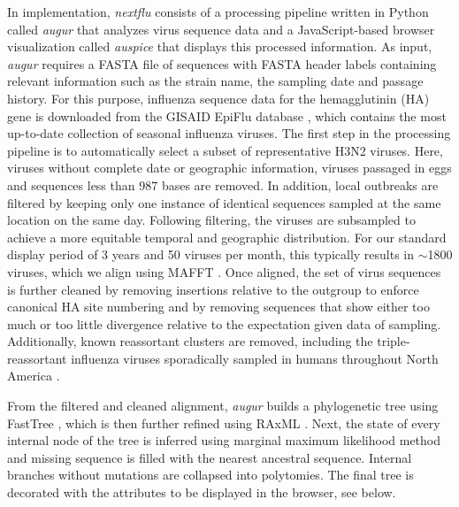 \documentclass{bioinfo}
\newcommand{\augur}{\textit{augur}}
\newcommand{\auspice}{\textit{auspice}}
\newcommand{\nextflu}{\textit{nextflu}}
\begin{document}
In implementation, \nextflu{} consists of a processing pipeline written in Python called \augur{} that analyzes virus sequence data and a JavaScript-based browser visualization called \auspice{} that displays this processed information.
As input, \augur{} requires a FASTA file of sequences with FASTA header labels containing relevant information such as the strain name, the sampling date and passage history.
For this purpose, influenza sequence data for the hemagglutinin (HA) gene is downloaded from the GISAID EpiFlu database \citep{GISAID}, which contains the most up-to-date collection of seasonal influenza viruses.
The first step in the processing pipeline is to automatically select a subset of representative H3N2 viruses.
Here, viruses without complete date or geographic information, viruses passaged in eggs and sequences less than 987 bases are removed.
In addition, local outbreaks are filtered by keeping only one instance of identical sequences sampled at the same location on the same day.
Following filtering, the viruses are subsampled to achieve a more equitable temporal and geographic distribution.
For our standard display period of 3 years and 50 viruses per month, this typically results in $\sim$1800 viruses, which we align using MAFFT \citep{katoh_mafft_2013}.
Once aligned, the set of virus sequences is further cleaned by removing insertions relative to the outgroup to enforce canonical HA site numbering and by removing sequences that show either too much or too little divergence relative to the expectation given data of sampling.
Additionally, known reassortant clusters are removed, including the triple-reassortant influenza viruses sporadically sampled in humans throughout North America \citep{bastien_human_2010}.

From the filtered and cleaned alignment, \augur{} builds a phylogenetic tree using FastTree \citep{price_fasttree_2009}, which is then further refined using RAxML \citep{stamatakis_raxml_2014}.
Next, the state of every internal node of the tree is inferred using marginal maximum likelihood method and missing sequence is filled with the nearest ancestral sequence.
Internal branches without mutations are collapsed into polytomies.
The final tree is decorated with the attributes to be displayed in the browser, see below.  
\end{document}
